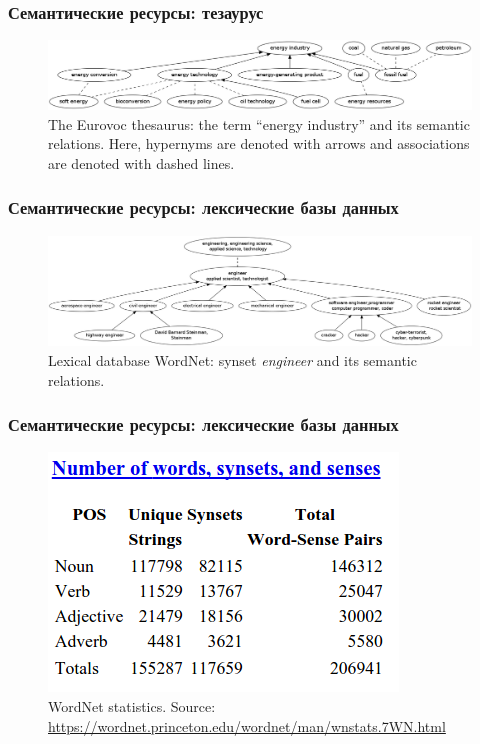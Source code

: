\begin{frame}
\frametitle{Семантические ресурсы: тезаурус }

\begin{figure}
\centering
\includegraphics[width=1.0\textwidth]{../figures/thesaurus-new}
\caption{ The Eurovoc thesaurus: the term ``energy industry'' and its semantic relations. Here, hypernyms are denoted with arrows and associations are denoted with dashed lines.}
\label{fig:thesaurus}
\end{figure}
\end{frame}




\begin{frame}
\frametitle{Семантические ресурсы: лексические базы данных }

\begin{figure}
\centering
\includegraphics[width=1.0\textwidth]{../figures/wordnet-new}
\caption{ Lexical database WordNet: synset \textit{engineer} and its semantic relations. }
\label{fig:wordnet}
\end{figure}
\end{frame}


\begin{frame}
\frametitle{Семантические ресурсы: лексические базы данных }

\begin{figure}
\centering
\includegraphics[width=.7\textwidth]{figures/wnstat}
\caption{ WordNet statistics. Source: \url{https://wordnet.princeton.edu/wordnet/man/wnstats.7WN.html} }
\label{fig:wordnet}
\end{figure}
\end{frame}



